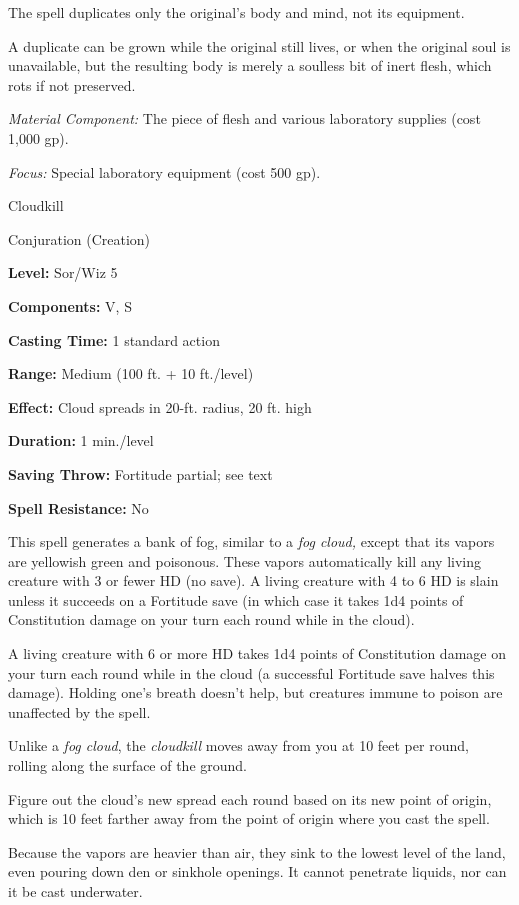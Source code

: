 \documentclass{article}
\begin{document}
The spell duplicates only the original's body and mind, not its equipment.

A duplicate can be grown while the original still lives, or when the original soul 
is unavailable, but the resulting body is merely a soulless bit of inert flesh, 
which rots if not preserved.

\textit{Material Component: }The piece of flesh and various laboratory supplies 
(cost 1,000 gp).

\textit{Focus: }Special laboratory equipment (cost 500 gp).

\vspace{12pt}
Cloudkill

Conjuration (Creation)

\textbf{Level:} Sor/Wiz 5

\textbf{Components:} V, S

\textbf{Casting Time:} 1 standard action

\textbf{Range: }Medium (100 ft. + 10 ft./level)

\textbf{Effect:} Cloud spreads in 20-ft. radius, 20 ft. high

\textbf{Duration:} 1 min./level

\textbf{Saving Throw:} Fortitude partial; see text

\textbf{Spell Resistance:} No

This spell generates a bank of fog, similar to a \textit{fog cloud, }except that 
its vapors are yellowish green and poisonous. These vapors automatically kill any 
living creature with 3 or fewer HD (no save). A living creature with 4 to 6 HD 
is slain unless it succeeds on a Fortitude save (in which case it takes 1d4 points 
of Constitution damage on your turn each round while in the cloud).

A living creature with 6 or more HD takes 1d4 points of Constitution damage on 
your turn each round while in the cloud (a successful Fortitude save halves this 
damage). Holding one's breath doesn't help, but creatures immune to poison are 
unaffected by the spell.

Unlike a \textit{fog cloud}, the \textit{cloudkill }moves away from you at 10 feet 
per round, rolling along the surface of the ground.

Figure out the cloud's new spread each round based on its new point of origin, 
which is 10 feet farther away from the point of origin where you cast the spell.

Because the vapors are heavier than air, they sink to the lowest level of the land, 
even pouring down den or sinkhole openings. It cannot penetrate liquids, nor can 
it be cast underwater.
\end{document}
